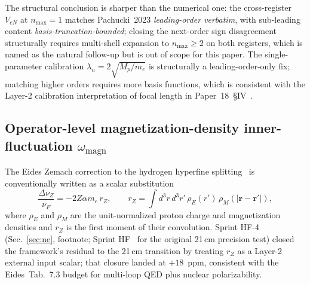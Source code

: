 \documentclass[twocolumn,prc,amsmath,amssymb,superscriptaddress]{revtex4-2}
\begin{document}
The structural conclusion is sharper than the numerical one: the
cross-register $V_{eN}$ at $n_{\max} = 1$ matches Pachucki~2023
\emph{leading-order verbatim}, with sub-leading content
\emph{basis-truncation-bounded}; closing the next-order sign
disagreement structurally requires multi-shell expansion to
$n_{\max} \geq 2$ on both registers, which is named as the natural
follow-up but is out of scope for this paper. The single-parameter
calibration $\lambda_n = 2\sqrt{M_p / m_e}$ is structurally a
leading-order-only fix; matching higher orders requires more basis
functions, which is consistent with the Layer-2 calibration
interpretation of focal length in Paper~18~\S IV~\cite{Paper18}.

\subsection{Operator-level magnetization-density inner-fluctuation
$\omega_{\mathrm{magn}}$}
\label{ssec:omega-magn}

The Eides Zemach correction to the hydrogen hyperfine
splitting~\cite{EidesGrotchShelyuto2007,Eides2024} is conventionally
written as a scalar substitution
\begin{equation}
  \frac{\Delta\nu_Z}{\nu_F}
  = -2 Z \alpha m_e\, r_Z,
\qquad
  r_Z = \int d^3 r\, d^3 r'\,
        \rho_E(r')\, \rho_M(|\mathbf{r} - \mathbf{r}'|),
\label{eq:eides-zemach}
\end{equation}
where $\rho_E$ and $\rho_M$ are the unit-normalized proton charge and
magnetization densities and $r_Z$ is the first moment of their
convolution. Sprint HF-4 (Sec.~\ref{sec:ne}, footnote;
Sprint HF~\cite{SprintHF} for the original 21\,cm precision test) closed
the framework's residual to the 21\,cm transition by treating $r_Z$ as
a Layer-2 external input scalar; that closure landed at $+18$~ppm,
consistent with the Eides~Tab.~7.3 budget for multi-loop QED plus
nuclear polarizability.
\end{document}
